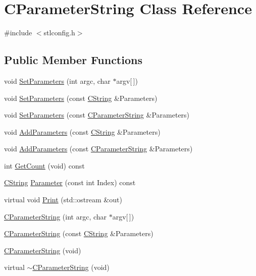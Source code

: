 \hypertarget{classCParameterString}{\section{C\-Parameter\-String Class Reference}
\label{classCParameterString}
}


{\ttfamily \#include $<$stlconfig.\-h$>$}

\subsection*{Public Member Functions}
\begin{DoxyCompactItemize}
\item 
void \hyperlink{classCParameterString_a89976a2d08971f59f0f628386c9e4f8a}{Set\-Parameters} (int argc, char $\ast$argv\mbox{[}$\,$\mbox{]})
\item 
void \hyperlink{classCParameterString_a17eb5d83508fef1f6bbe77eac7960769}{Set\-Parameters} (const \hyperlink{classCString}{C\-String} \&Parameters)
\item 
void \hyperlink{classCParameterString_a46bb74a7b8c7bf6e719999e0ed7d13ec}{Set\-Parameters} (const \hyperlink{classCParameterString}{C\-Parameter\-String} \&Parameters)
\item 
void \hyperlink{classCParameterString_a7e992a8912bd5cebd00499dd5c410936}{Add\-Parameters} (const \hyperlink{classCString}{C\-String} \&Parameters)
\item 
void \hyperlink{classCParameterString_ab605b9f8c932a0bad1cbf1d7bcd3bb8c}{Add\-Parameters} (const \hyperlink{classCParameterString}{C\-Parameter\-String} \&Parameters)
\item 
int \hyperlink{classCParameterString_a7424a983bd9fb0e1b7640f0fe15d6435}{Get\-Count} (void) const 
\item 
\hyperlink{classCString}{C\-String} \hyperlink{classCParameterString_a54c39848452195f3664000a73d9e8e59}{Parameter} (const int Index) const 
\item 
virtual void \hyperlink{classCParameterString_aa98b64225630c11f600d6e120490d4c4}{Print} (std\-::ostream \&out)
\item 
\hyperlink{classCParameterString_a971709de277fc4c2a1cd5f74ec90d9b4}{C\-Parameter\-String} (int argc, char $\ast$argv\mbox{[}$\,$\mbox{]})
\item 
\hyperlink{classCParameterString_a903204c66252ec198d60539042ba8a89}{C\-Parameter\-String} (const \hyperlink{classCString}{C\-String} \&Parameters)
\item 
\hyperlink{classCParameterString_a91de2c236e00587751ce53046bde61bd}{C\-Parameter\-String} (void)
\item 
virtual \hyperlink{classCParameterString_ae5dedc785b5ec9716e8c690fde7bc1b4}{$\sim$\-C\-Parameter\-String} (void)
\end{DoxyCompactItemize}
